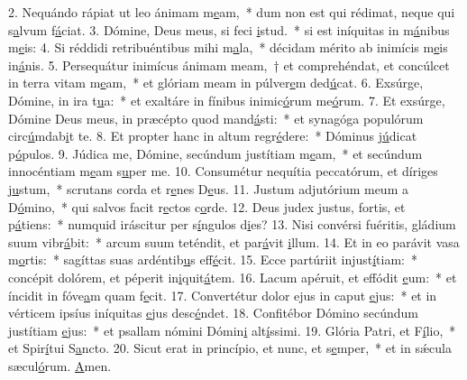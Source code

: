2. Nequándo rápiat ut leo ánimam m\uline{e}am,~* dum non est qui rédimat, neque qui s\uline{a}lvum f\uline{á}ciat.
3. Dómine, Deus meus, si feci \uline{i}stud.~* si est iníquitas in m\uline{á}nibus m\uline{e}is:
4. Si réddidi retribuéntibus mihi m\uline{a}la,~* décidam mérito ab inimícis m\uline{e}is in\uline{á}nis.
5. Persequátur inimícus ánimam meam,~† et comprehéndat, et concúlcet in terra vitam m\uline{e}am,~* et glóriam meam in púlver\uline{e}m ded\uline{ú}cat.
6. Exsúrge, Dómine, in ira t\uline{u}a:~* et exaltáre in fínibus inimic\uline{ó}rum me\uline{ó}rum.
7. Et exsúrge, Dómine Deus meus, in præcépto quod mand\uline{á}sti:~* et synagóga populórum circ\uline{ú}mdab\uline{i}t te.
8. Et propter hanc in altum regr\uline{é}dere:~* Dóminus j\uline{ú}dicat p\uline{ó}pulos.
9. Júdica me, Dómine, secúndum justítiam m\uline{e}am,~* et secúndum innocéntiam m\uline{e}am s\uline{u}per me.
10. Consumétur nequítia peccatórum, et díriges j\uline{u}stum,~* scrutans corda et r\uline{e}nes D\uline{e}us.
11. Justum adjutórium meum a D\uline{ó}mino,~* qui salvos facit r\uline{e}ctos c\uline{o}rde.
12. Deus judex justus, fortis, et p\uline{á}tiens:~* numquid iráscitur per s\uline{í}ngulos d\uline{i}es?
13. Nisi convérsi fuéritis, gládium suum vibr\uline{á}bit:~* arcum suum teténdit, et par\uline{á}vit \uline{i}llum.
14. Et in eo parávit vasa m\uline{o}rtis:~* sagíttas suas ardéntib\uline{u}s eff\uline{é}cit.
15. Ecce partúriit injust\uline{í}tiam:~* concépit dolórem, et péperit in\uline{i}quit\uline{á}tem.
16. Lacum apéruit, et effódit \uline{e}um:~* et íncidit in fóve\uline{a}m quam f\uline{e}cit.
17. Convertétur dolor ejus in caput \uline{e}jus:~* et in vérticem ipsíus iníquitas \uline{e}jus desc\uline{é}ndet.
18. Confitébor Dómino secúndum justítiam \uline{e}jus:~* et psallam nómini Dómin\uline{i} alt\uline{í}ssimi.
19. Glória Patri, et F\uline{í}lio,~* et Spir\uline{í}tui S\uline{a}ncto.
20. Sicut erat in princípio, et nunc, et s\uline{e}mper,~* et in sǽcula sæcul\uline{ó}rum. \uline{A}men.

